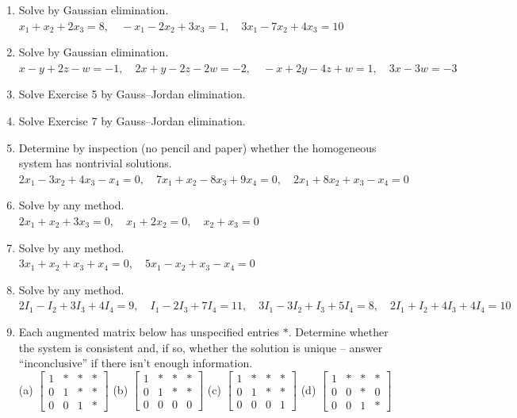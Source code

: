 \documentclass{article}
\theoremstyle{mystyle}
\begin{document}
\begin{enumerate}
    \item[5.] Solve by Gaussian elimination.\\
    $x_1+x_2+2x_3=8,\quad -x_1-2x_2+3x_3=1,\quad 3x_1-7x_2+4x_3=10$

    \item[7.] Solve by Gaussian elimination.\\
    $x-y+2z-w=-1,\quad 2x+y-2z-2w=-2,\quad -x+2y-4z+w=1,\quad 3x-3w=-3$

    \item[9.] Solve Exercise 5 by Gauss--Jordan elimination.

    \item[11.] Solve Exercise 7 by Gauss--Jordan elimination.

    \item[13.] Determine by inspection (no pencil and paper) whether the homogeneous system has nontrivial solutions.\\
    $2x_1-3x_2+4x_3-x_4=0,\quad 7x_1+x_2-8x_3+9x_4=0,\quad 2x_1+8x_2+x_3-x_4=0$

    \item[15.] Solve by any method.\\
    $2x_1+x_2+3x_3=0,\quad x_1+2x_2=0,\quad x_2+x_3=0$

    \item[17.] Solve by any method.\\
    $3x_1+x_2+x_3+x_4=0,\quad 5x_1-x_2+x_3-x_4=0$

    \item[21.] Solve by any method.\\
    $2I_1-I_2+3I_3+4I_4=9,\quad I_1-2I_3+7I_4=11,\quad 3I_1-3I_2+I_3+5I_4=8,\quad 2I_1+I_2+4I_3+4I_4=10$

    \item[23.] Each augmented matrix below has unspecified entries $*$. Determine whether the system is consistent and, if so, whether the solution is unique -- answer ``inconclusive'' if there isn't enough information.\\
    (a) $\begin{bmatrix}1&*&*&*\\0&1&*&*\\0&0&1&*\end{bmatrix}$
    (b) $\begin{bmatrix}1&*&*&*\\0&1&*&*\\0&0&0&0\end{bmatrix}$
    (c) $\begin{bmatrix}1&*&*&*\\0&1&*&*\\0&0&0&1\end{bmatrix}$
    (d) $\begin{bmatrix}1&*&*&*\\0&0&*&0\\0&0&1&*\end{bmatrix}$


\end{enumerate}
\end{document}

